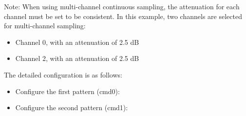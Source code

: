 \documentclass[main\_\_EN.tex]{subfiles}
\begin{document}
Note: When using multi-channel continuous sampling, the attenuation for each channel must be set to be consistent. In this example, two channels are selected for multi-channel sampling:

\begin{itemize}
    \item Channel 0, with an attenuation of 2.5 dB
    \item Channel 2, with an attenuation of 2.5 dB
\end{itemize}

The detailed configuration is as follows:

\begin{itemize}
    \item Configure the first pattern (cmd0):

\centering
{}%
%
%
\reglabel{}\regnewline%
\begin{regdesc}\end{regdesc}
\end{itemize}

\begin{itemize}
    \item Configure the second pattern (cmd1):

\centering
{}%
%
%
\reglabel{}\regnewline%
\begin{regdesc}\end{regdesc}
\end{itemize}
\end{document}
